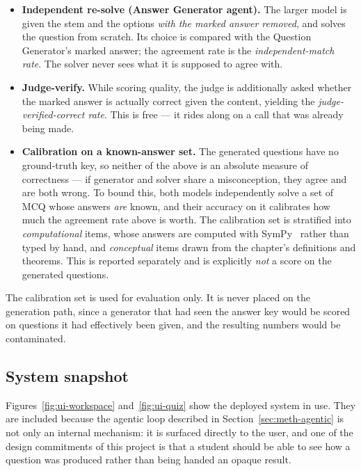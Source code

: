 \begin{itemize}
  \item \textbf{Independent re-solve (Answer Generator agent).} The larger model is
        given the stem and the options \emph{with the marked answer removed}, and
        solves the question from scratch. Its choice is compared with the Question
        Generator's marked answer; the agreement rate is the
        \emph{independent-match rate}. The solver never sees what it is supposed to
        agree with.
  \item \textbf{Judge-verify.} While scoring quality, the judge is additionally
        asked whether the marked answer is actually correct given the content,
        yielding the \emph{judge-verified-correct rate}. This is free --- it rides
        along on a call that was already being made.
  \item \textbf{Calibration on a known-answer set.} The generated questions have no
        ground-truth key, so neither of the above is an absolute measure of
        correctness --- if generator and solver share a misconception, they agree
        and are both wrong. To bound this, both models independently solve a set of
        MCQ whose answers \emph{are} known, and their accuracy on it calibrates how
        much the agreement rate above is worth. The calibration set is stratified
        into \emph{computational} items, whose answers are computed with
        SymPy~\cite{sympy} rather than typed by hand, and \emph{conceptual} items
        drawn from the chapter's definitions and theorems. This is reported
        separately and is explicitly \emph{not} a score on the generated questions.
\end{itemize}

The calibration set is used for evaluation only. It is never placed on the
generation path, since a generator that had seen the answer key would be scored on
questions it had effectively been given, and the resulting numbers would be
contaminated.

\subsection{System snapshot}
\label{sec:meth-snapshot}

Figures~\ref{fig:ui-workspace} and~\ref{fig:ui-quiz} show the deployed system in
use. They are included because the agentic loop described in
Section~\ref{sec:meth-agentic} is not only an internal mechanism: it is surfaced
directly to the user, and one of the design commitments of this project is that a
student should be able to see how a question was produced rather than being handed
an opaque result.

